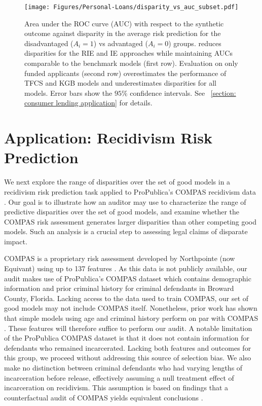 \documentclass{article}
\begin{document}
\begin{figure}[htbp!]
    \centering
    \texttt{[image: Figures/Personal-Loans/disparity\_vs\_auc\_subset.pdf]}
    \caption{Area under the ROC curve (AUC) with respect to the synthetic outcome against disparity in the average risk prediction for the disadvantaged ($A_i=1$) vs advantaged ($A_i=0$) groups.
    \fairs reduces disparities for the RIE and IE approaches while maintaining AUCs comparable to the benchmark models (first row). 
    Evaluation on only funded applicants (second row) overestimates the performance of TFCS and KGB models and underestimates disparities for all models.
    Error bars show the $95\%$ confidence intervals. See \textsection~\ref{section: consumer lending application} for details.}
    \label{fig:selective_disparities}
\end{figure}

\section{Application: Recidivism Risk Prediction}\label{section: recidivism application}
We next explore the range of disparities over the set of good models in a recidivism risk prediction task applied to ProPublica's COMPAS recidivism data \cite{AngwinEtAl(16)}. Our goal is to illustrate how an auditor may use \fairs to characterize the range of predictive disparities over the set of good models, and examine whether the COMPAS risk assessment generates larger disparities than other competing good models. Such an analysis is a crucial step to assessing legal claims of disparate impact.

COMPAS is a proprietary risk assessment developed by Northpointe (now Equivant) using up to 137 features \cite{Rudin2020Age}. As this data is not publicly available, our audit makes use of ProPublica's COMPAS dataset which contains demographic information and prior criminal history for criminal defendants in Broward County, Florida. Lacking access to the data used to train COMPAS, our set of good models may not include COMPAS itself. Nonetheless, prior work has shown that simple models using age and criminal history perform on par with COMPAS \cite{angelino2018learning}. 
These features will therefore suffice to perform our audit.
A notable limitation of the ProPublica COMPAS dataset is that it does not contain information for defendants who remained incarcerated. 
Lacking both features and outcomes for this group, we proceed without addressing this source of selection bias. We also make no distinction between criminal defendants who had varying lengths of incarceration before release, effectively assuming a null treatment effect of incarceration on recidivism. This assumption is based on findings that a counterfactual audit of COMPAS yields equivalent conclusions \cite{mishler2019modeling}. 
\end{document}
